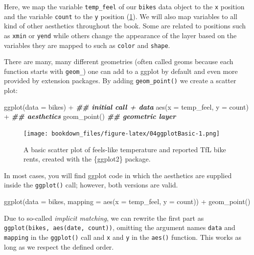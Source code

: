 \documentclass[
]{krantz}
\makeatletter
\newenvironment{Shaded}{\begin{snugshade}}{\end{snugshade}}
\newcommand{\AttributeTok}[1]{\textcolor[rgb]{0.61,0.61,0.61}{#1}}
\newcommand{\DocumentationTok}[1]{\textcolor[rgb]{0.37,0.37,0.37}{\textbf{\textit{#1}}}}
\newcommand{\FunctionTok}[1]{\textcolor[rgb]{0,0,0}{#1}}
\newcommand{\NormalTok}[1]{#1}
\newcommand{\SpecialCharTok}[1]{\textcolor[rgb]{0,0,0}{#1}}
\newenvironment{kframe}{%
\medskip{}
\setlength{\fboxsep}{.8em}
 \def\at@end@of@kframe{}%
 \ifinner\ifhmode%
  \def\at@end@of@kframe{\end{minipage}}%
  \begin{minipage}{\columnwidth}%
 \fi\fi%
 \def\FrameCommand##1{\hskip\@totalleftmargin \hskip-\fboxsep
 \colorbox{shadecolor}{##1}\hskip-\fboxsep
     \hskip-\linewidth \hskip-\@totalleftmargin \hskip\columnwidth}%
 \MakeFramed {\advance\hsize-\width
   \@totalleftmargin\z@ \linewidth\hsize
   \@setminipage}}%
 {\par\unskip\endMakeFramed%
 \at@end@of@kframe}
\renewenvironment{Shaded}{\begin{kframe}}{\end{kframe}}
\makeatother
\begin{document}
Here, we map the variable \texttt{temp\_feel} of our \texttt{bikes} data object to the \texttt{x} position and the variable \texttt{count} to the \texttt{y} position (\ref{fig:04ggplotBasic}). We will also map variables to all kind of other aesthetics throughout the book. Some are related to positions such as \texttt{xmin} or \texttt{yend} while others change the appearance of the layer based on the variables they are mapped to such as \texttt{color} and \texttt{shape}.

There are many, many different geometries (often called geoms because each function starts with \texttt{geom\_}) one can add to a ggplot by default and even more provided by extension packages. By adding \texttt{geom\_point()} we create a scatter plot:

\begin{Shaded}
\begin{Highlighting}[]
\FunctionTok{ggplot}\NormalTok{(}\AttributeTok{data =}\NormalTok{ bikes) }\SpecialCharTok{+} \DocumentationTok{\#\# initial call + data}
  \FunctionTok{aes}\NormalTok{(}\AttributeTok{x =}\NormalTok{ temp\_feel, }\AttributeTok{y =}\NormalTok{ count) }\SpecialCharTok{+} \DocumentationTok{\#\# aesthetics}
  \FunctionTok{geom\_point}\NormalTok{() }\DocumentationTok{\#\# geometric layer}
\end{Highlighting}
\end{Shaded}

\begin{figure}
\centering
\texttt{[image: bookdown\_files/figure-latex/04ggplotBasic-1.png]}
\caption{\label{fig:04ggplotBasic}A basic scatter plot of feels-like temperature and reported TfL bike rents, created with the \{ggplot2\} package.}
\end{figure}

In most cases, you will find ggplot code in which the aesthetics are supplied inside the \texttt{ggplot()} call; however, both versions are valid.

\begin{Shaded}
\begin{Highlighting}[]
\FunctionTok{ggplot}\NormalTok{(}\AttributeTok{data =}\NormalTok{ bikes, }\AttributeTok{mapping =} \FunctionTok{aes}\NormalTok{(}\AttributeTok{x =}\NormalTok{ temp\_feel, }\AttributeTok{y =}\NormalTok{ count)) }\SpecialCharTok{+}
  \FunctionTok{geom\_point}\NormalTok{()}
\end{Highlighting}
\end{Shaded}

Due to so-called \emph{implicit matching}, we can rewrite the first part as \texttt{ggplot(bikes,\ aes(date,\ count))}, omitting the argument names \texttt{data} and \texttt{mapping} in the \texttt{ggplot()} call and \texttt{x} and \texttt{y} in the \texttt{aes()} function. This works as long as we respect the defined order.
\end{document}
